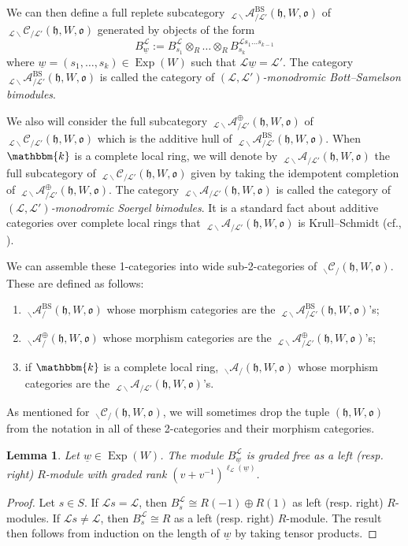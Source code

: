 \documentclass{amsart}
\renewcommand{\k}{\mathbbm{k}}
\newcommand{\scrL}{\mathcal{L}}
\newcommand{\fr}[1]{\mathfrak{#1}}
\DeclareMathOperator{\BS}{BS}
\newcommand{\Cmon}[2]{\:_{#1 \backslash} \mathcal{C}_{/ #2} }
\newcommand{\Amon}[2]{\:_{#1 \backslash} \mathcal{A}_{/ #2} }
\DeclareMathOperator{\Exp}{Exp}
\newcommand{\uw}{\underline{w}}
\newtheorem{lemma}[subsubsection]{Lemma}
\theoremstyle{definition}
\numberwithin{equation}{subsection}
\begin{document}
We can then define a full replete subcategory $\Amon{\scrL}{\scrL'}^{\BS} (\fr{h}, W, \fr{o})$ of $\Cmon{\scrL}{\scrL'} (\fr{h}, W, \fr{o})$ generated by objects of the form 
\[ B_{\uw}^{\scrL} := B_{s_1}^{\scrL} \otimes_R \ldots \otimes_R B_{s_k}^{\scrL s_1 \ldots s_{k-1}}\]
where $\uw = (s_1, \ldots, s_k) \in \Exp (W)$ such that $\scrL \uw = \scrL'$. 
The category $\Amon{\scrL}{\scrL'}^{\BS} (\fr{h}, W, \fr{o})$ is called the category of \emph{$(\scrL, \scrL')$-monodromic Bott--Samelson bimodules}.

We also will consider the full subcategory $\Amon{\scrL}{\scrL'}^{\oplus} (\fr{h}, W, \fr{o})$ of $\Cmon{\scrL}{\scrL'} (\fr{h}, W, \fr{o})$ which is the additive hull of $\Amon{\scrL}{\scrL'}^{\BS} (\fr{h}, W, \fr{o})$.
When $\k$ is a complete local ring, we will denote by $\Amon{\scrL}{\scrL'} (\fr{h}, W, \fr{o})$ the full subcategory of $\Cmon{\scrL}{\scrL'} (\fr{h}, W, \fr{o})$ given by taking the idempotent completion of  $\Amon{\scrL}{\scrL'}^{\oplus} (\fr{h}, W, \fr{o})$.
The category $\Amon{\scrL}{\scrL'} (\fr{h}, W, \fr{o})$ is called the category of \emph{$(\scrL, \scrL')$-monodromic Soergel bimodules}.
It is a standard fact about additive categories over complete local rings that $\Amon{\scrL}{\scrL'} (\fr{h}, W, \fr{o})$ is Krull--Schmidt (cf., \cite[Example A.8.6]{Ach1}).

We can assemble these 1-categories into wide sub-2-categories of $\Cmon{}{} (\fr{h}, W, \fr{o})$. These are defined as follows:
\begin{enumerate}
    \item $\Amon{}{}^{\BS} (\fr{h}, W, \fr{o})$ whose morphism categories are the $\Amon{\scrL}{\scrL'}^{\BS} (\fr{h}, W, \fr{o})$'s;
    \item $\Amon{}{}^{\oplus} (\fr{h}, W, \fr{o})$ whose morphism categories are the $\Amon{\scrL}{\scrL'}^{\oplus} (\fr{h}, W, \fr{o})$'s;
    \item if $\k$ is a complete local ring, $\Amon{}{} (\fr{h}, W, \fr{o})$ whose morphism categories are the $\Amon{\scrL}{\scrL'} (\fr{h}, W, \fr{o})$'s.
\end{enumerate}
As mentioned for $\Cmon{}{} (\fr{h}, W, \fr{o})$, we will sometimes drop the tuple $(\fr{h}, W, \fr{o})$ from the notation in all of these 2-categories and their morphism categories.

\begin{lemma}\label{lem:bott_samelson_bimodules_are_free}
    Let $\uw \in \Exp (W)$.
    The module $B_{\uw}^{\scrL}$ is graded free as a left (resp. right) $R$-module with graded rank $(v+v^{-1})^{\ell_{\scrL} (\uw)}$.
\end{lemma}
\begin{proof}
    Let $s \in S$. If $\scrL s = \scrL$, then $B_s^{\scrL} \cong R(-1) \oplus R(1)$ as left (resp. right) $R$-modules.
    If $\scrL s \neq \scrL$, then $B_s^{\scrL} \cong R$ as a left (resp. right) $R$-module.
    The result then follows from induction on the length of $\uw$ by taking tensor products.
\end{proof}
\end{document}
